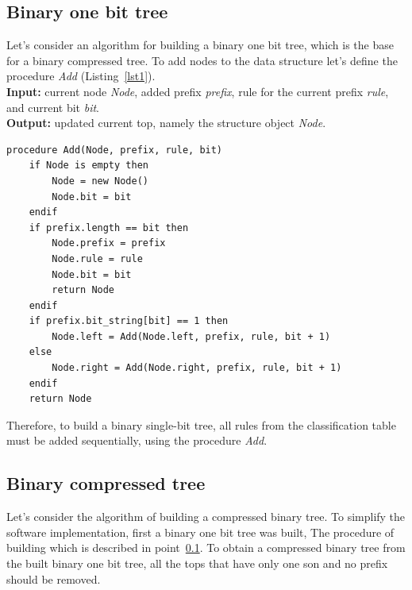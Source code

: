 \documentclass[conference]{IEEEtran}
\begin{document}
    \subsection{Binary one bit tree}
        \label{section:binone}
            Let's consider an algorithm for building a binary one bit tree,
            which is the base for a binary compressed tree.
            To add nodes to the data structure let's define the procedure \emph{Add} (Listing~\ref{lst1}). 
            \\
            {\bf Input:} current node \emph{Node}, added prefix \emph{prefix}, 
            rule for the current prefix \emph{rule}, and current bit \emph{bit}. 
            \\
            {\bf Output:} updated current top, namely the structure object \emph{Node}.
\\
\begin{lstlisting}[caption=Procedure for adding a vertex to a binary one bit tree., label=lst1]
procedure Add(Node, prefix, rule, bit)
    if Node is empty then
        Node = new Node()
        Node.bit = bit
    endif
    if prefix.length == bit then
        Node.prefix = prefix
        Node.rule = rule
        Node.bit = bit
        return Node
    endif
    if prefix.bit_string[bit] == 1 then
        Node.left = Add(Node.left, prefix, rule, bit + 1)
    else
        Node.right = Add(Node.right, prefix, rule, bit + 1)
    endif
    return Node
\end{lstlisting}
\vspace{1em}
            Therefore, to build a binary single-bit tree, all rules from the classification table 
            must be added sequentially, using the procedure \emph{Add}.

        \subsection{Binary compressed tree}
            Let's consider the algorithm of building a compressed binary tree. 
            To simplify the software implementation, first a binary one bit tree was built,
            The procedure of building which is described in point~\ref{section:binone}. 
            To obtain a compressed binary tree from the built binary one bit tree,
            all the tops that have only one son and no prefix should be removed.
\end{document}
